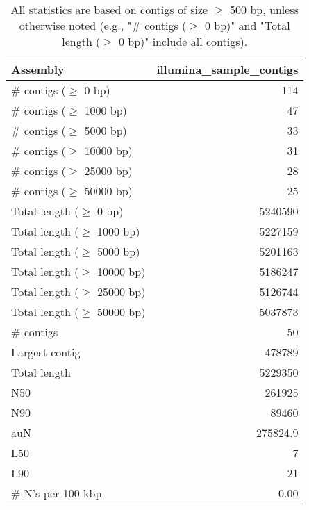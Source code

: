 \documentclass[12pt,a4paper]{article}
\begin{document}
\begin{table}[ht]
\begin{center}
\caption{All statistics are based on contigs of size $\geq$ 500 bp, unless otherwise noted (e.g., "\# contigs ($\geq$ 0 bp)" and "Total length ($\geq$ 0 bp)" include all contigs).}
\begin{tabular}{|l*{1}{|r}|}
\hline
Assembly & illumina\_sample\_contigs \\ \hline
\# contigs ($\geq$ 0 bp) & 114 \\ \hline
\# contigs ($\geq$ 1000 bp) & 47 \\ \hline
\# contigs ($\geq$ 5000 bp) & 33 \\ \hline
\# contigs ($\geq$ 10000 bp) & 31 \\ \hline
\# contigs ($\geq$ 25000 bp) & 28 \\ \hline
\# contigs ($\geq$ 50000 bp) & 25 \\ \hline
Total length ($\geq$ 0 bp) & 5240590 \\ \hline
Total length ($\geq$ 1000 bp) & 5227159 \\ \hline
Total length ($\geq$ 5000 bp) & 5201163 \\ \hline
Total length ($\geq$ 10000 bp) & 5186247 \\ \hline
Total length ($\geq$ 25000 bp) & 5126744 \\ \hline
Total length ($\geq$ 50000 bp) & 5037873 \\ \hline
\# contigs & 50 \\ \hline
Largest contig & 478789 \\ \hline
Total length & 5229350 \\ \hline
N50 & 261925 \\ \hline
N90 & 89460 \\ \hline
auN & 275824.9 \\ \hline
L50 & 7 \\ \hline
L90 & 21 \\ \hline
\# N's per 100 kbp & 0.00 \\ \hline
\end{tabular}
\end{center}
\end{table}
\end{document}
